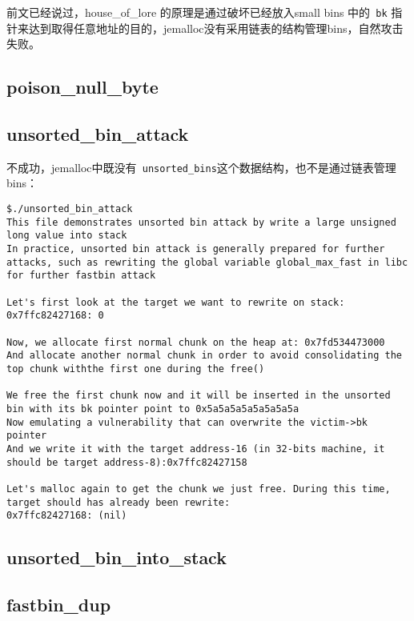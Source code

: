 前文已经说过，house\_of\_lore 的原理是通过破坏已经放入small bins 中的\verb+ bk+ 指针来达到取得任意地址的目的，jemalloc没有采用链表的结构管理bins，自然攻击失败。

\subsection{poison\_null\_byte}

\subsection{unsorted\_bin\_attack}

不成功，jemalloc中既没有\verb+ unsorted_bins+这个数据结构，也不是通过链表管理bins：
\begin{verbatim}
$./unsorted_bin_attack 
This file demonstrates unsorted bin attack by write a large unsigned long value into stack
In practice, unsorted bin attack is generally prepared for further attacks, such as rewriting the global variable global_max_fast in libc for further fastbin attack

Let's first look at the target we want to rewrite on stack:
0x7ffc82427168: 0

Now, we allocate first normal chunk on the heap at: 0x7fd534473000
And allocate another normal chunk in order to avoid consolidating the top chunk withthe first one during the free()

We free the first chunk now and it will be inserted in the unsorted bin with its bk pointer point to 0x5a5a5a5a5a5a5a5a
Now emulating a vulnerability that can overwrite the victim->bk pointer
And we write it with the target address-16 (in 32-bits machine, it should be target address-8):0x7ffc82427158

Let's malloc again to get the chunk we just free. During this time, target should has already been rewrite:
0x7ffc82427168: (nil)

\end{verbatim}

\subsection{unsorted\_bin\_into\_stack}

\subsection{fastbin\_dup}


